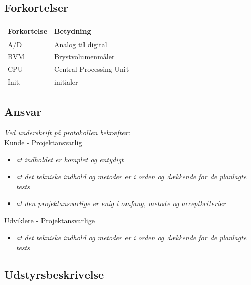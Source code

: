 		\subsection{Forkortelser}
		\vspace{1cm}
\begin{table}[hbt]
\centering
\label{ordliste}
\begin{tabular}{|l|l|}
\hline
\textbf{Forkortelse             } & \textbf{Betydning} \\ \hline
A/D & Analog til digital \\ \hline
BVM & Brystvolumenmåler \\ \hline
CPU & Central Processing Unit \\ \hline
Init. & initialer \\ \hline
\end{tabular}
\end{table}
		  
		\subsection{Ansvar}
		\textit{		Ved underskrift på protokollen bekræfter: }\\
		
		Kunde - Projektansvarlig
		\begin{itemize}
			\item \textit{at indholdet er komplet og entydigt}
			\item \textit{at det tekniske indhold og metoder er i orden og dækkende for de planlagte tests}
			\item \textit{at den projektansvarlige er enig i omfang, metode og acceptkriterier}
		\end{itemize}
		
		Udviklere - Projektansvarlige
		\begin{itemize}
			\item \textit{at det tekniske indhold og metoder er i orden og dækkende for de planlagte tests}
		\end{itemize}
		
		\subsection{Udstyrsbeskrivelse}
	
